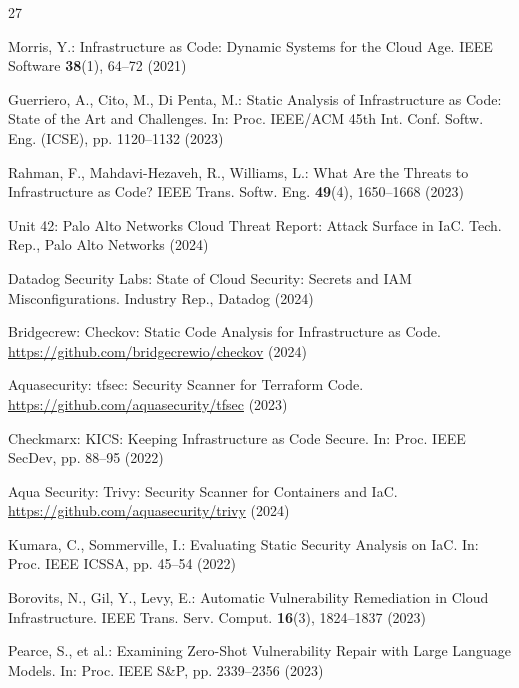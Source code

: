 \documentclass[runningheads]{llncs}
\begin{document}
%
%
\begin{thebibliography}{27}
\setlength{\itemsep}{-0.8pt}
\small
\setlength{\itemsep}{0pt}\setlength{\parskip}{0pt}
\setlength{\itemsep}{0.5pt}\setlength{\parskip}{0pt}

Morris, Y.: Infrastructure as Code: Dynamic Systems for the Cloud Age. IEEE Software \textbf{38}(1), 64--72 (2021)

Guerriero, A., Cito, M., Di Penta, M.: Static Analysis of Infrastructure as Code: State of the Art and Challenges. In: Proc. IEEE/ACM 45th Int. Conf. Softw. Eng. (ICSE), pp. 1120--1132 (2023)

Rahman, F., Mahdavi-Hezaveh, R., Williams, L.: What Are the Threats to Infrastructure as Code? IEEE Trans. Softw. Eng. \textbf{49}(4), 1650--1668 (2023)

Unit 42: Palo Alto Networks Cloud Threat Report: Attack Surface in IaC. Tech. Rep., Palo Alto Networks (2024)

Datadog Security Labs: State of Cloud Security: Secrets and IAM Misconfigurations. Industry Rep., Datadog (2024)

Bridgecrew: Checkov: Static Code Analysis for Infrastructure as Code. \url{https://github.com/bridgecrewio/checkov} (2024)

Aquasecurity: tfsec: Security Scanner for Terraform Code. \url{https://github.com/aquasecurity/tfsec} (2023)

Checkmarx: KICS: Keeping Infrastructure as Code Secure. In: Proc. IEEE SecDev, pp. 88--95 (2022)

Aqua Security: Trivy: Security Scanner for Containers and IaC. \url{https://github.com/aquasecurity/trivy} (2024)

Kumara, C., Sommerville, I.: Evaluating Static Security Analysis on IaC. In: Proc. IEEE ICSSA, pp. 45--54 (2022)

Borovits, N., Gil, Y., Levy, E.: Automatic Vulnerability Remediation in Cloud Infrastructure. IEEE Trans. Serv. Comput. \textbf{16}(3), 1824--1837 (2023)

Pearce, S., et al.: Examining Zero-Shot Vulnerability Repair with Large Language Models. In: Proc. IEEE S\&P, pp. 2339--2356 (2023)


\end{thebibliography}
\end{document}
